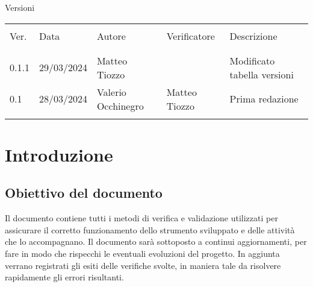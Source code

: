 \documentclass[italian,12pt]{article} %
\begin{document}


\newpage



\captionsetup[table]{list=no}

\begin{table}[!h]
	\begin{center}
		Versioni\\
		\vspace{0.5cm}
		\begin{tabular}{ l l l l l }
			\hline                                                                          		\\[-2ex]
			Ver. & Data       & Autore   & Verificatore          	& Descrizione					\\
			\\[-2ex] \hline \\[-1.5ex]
			0.1.1  & 29/03/2024 & Matteo Tiozzo 	   & 				& Modificato tabella versioni	\\
			0.1  & 28/03/2024 & Valerio Occhinegro & Matteo Tiozzo 	& Prima redazione				\\
			\\[-1.5ex] \hline
		\end{tabular}
	\end{center}
\end{table}
\captionsetup[table]{list=yes}

\newpage

\tableofcontents

\newpage

\listoftables

\listoffigures

\newpage

\section{Introduzione}

\subsection{Obiettivo del documento}
Il documento contiene tutti i metodi di verifica e validazione utilizzati
per assicurare il corretto funzionamento dello strumento sviluppato e delle
attività che lo accompagnano.
Il documento sarà sottoposto a continui aggiornamenti, per fare in modo che 
rispecchi le eventuali evoluzioni del progetto.
In aggiunta verrano registrati gli esiti delle verifiche svolte, in maniera tale 
da risolvere rapidamente gli errori risultanti.
\end{document}
